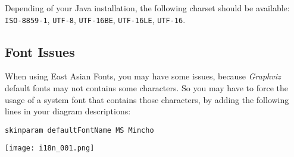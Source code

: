Depending of your Java installation, the following charset should be available:
\texttt{ISO-8859-1}, \texttt{UTF-8}, \texttt{UTF-16BE}, \texttt{UTF-16LE},
\texttt{UTF-16}.

\subsection{Font Issues} 

When using East Asian Fonts, you may have some issues, because \textit{Graphviz}
default fonts may not contains some characters. 
So you may have to force the usage of a system font that contains those characters, by adding the 
following lines in your diagram descriptions:

% 
% 
% 
% 

\begin{lstlisting}
skinparam defaultFontName MS Mincho
\end{lstlisting}

\begin{center}
\texttt{[image: i18n\_001.png]}
\end{center}


